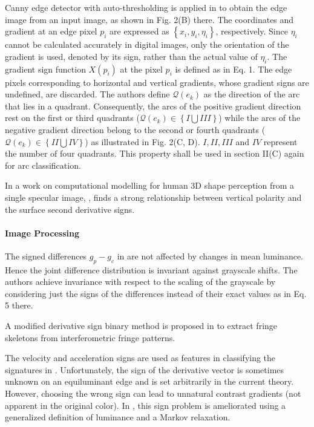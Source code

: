 \documentclass[11pt]{book}
\begin{document}
Canny edge detector with auto-thresholding is applied in \cite{dong2018fast}
to obtain the edge image from an input image, as shown in Fig. 2(B)
there. The coordinates and gradient at an edge pixel $p_{i}$ are
expressed as $\left\{ x_{i},y_{i},\eta_{i}\right\} $, respectively.
Since $\eta_{i}$ cannot be calculated accurately in digital images,
only the orientation of the gradient is used, denoted by its sign,
rather than the actual value of $\eta_{i}$. The gradient sign function
$X\left(p_{i}\right)$ at the pixel $p_{i}$ is defined as in Eq.
1. The edge pixels corresponding to horizontal and vertical gradients,
whose gradient signs are undefined, are discarded. The authors define
$\mathscr{Q}\left(e_{k}\right)$ as the direction of the arc that
lies in a quadrant. Consequently, the arcs of the positive gradient
direction rest on the first or third quadrants ($\mathscr{Q}(e_{k})\in\left\{ I\bigcup III\right\} $)
while the arcs of the negative gradient direction belong to the second
or fourth quadrants ($\mathscr{Q}(e_{k})\in\left\{ II\bigcup IV\right\} $)
as illustrated in Fig. 2(C, D). $I,II,III$ and $IV$ represent the
number of four quadrants. This property shall be used in section II(C)
again for arc classification.

In a work on computational modelling for human 3D shape perception from a single specular image, \cite{shimokawa2019computational}, finds a strong relationship
between vertical polarity and the surface second derivative signs.


\paragraph{Image Processing}

The signed differences $g_{p}-g_{c}$ in \cite{ojala2002multiresolution}
are not affected by changes in mean luminance. Hence the joint difference
distribution is invariant against grayscale shifts. The authors achieve
invariance with respect to the scaling of the grayscale by considering
just the signs of the differences instead of their exact values as
in Eq. 5 there.

A modified derivative sign binary method is proposed in \cite{zhang2002fringe}
to extract fringe skeletons from interferometric fringe patterns.

The velocity and acceleration signs are used as features in classifying
the signatures in \cite{herdaugdelen2004dynamic}. Unfortunately,
the sign of the derivative vector is sometimes unknown on an equiluminant
edge and is set arbitrarily in the current theory. However, choosing
the wrong sign can lead to unnatural contrast gradients (not apparent
in the original color). In \cite{drew2009improved}, this sign problem
is ameliorated using a generalized definition of luminance and a Markov
relaxation.
\end{document}
